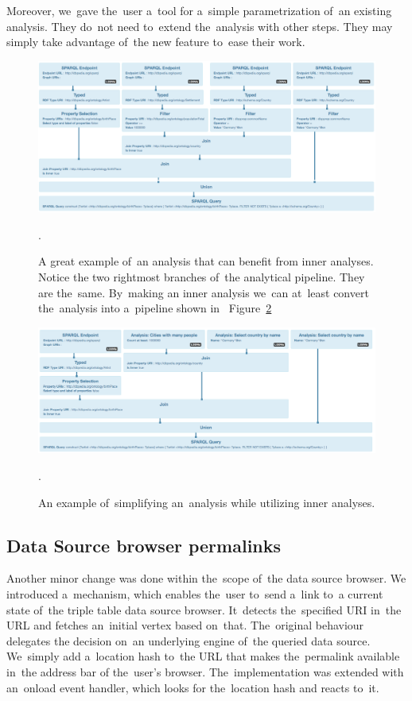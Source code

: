 Moreover, we~gave the~user a~tool for a~simple parametrization of~an existing analysis. 
They do~not need to~extend the~analysis with other steps. They may simply take 
advantage of~the new feature to~ease their work.

\begin{figure}
	\centering
	\includegraphics[width=140mm]{img/inner-example.png}
	\caption{A great example of~an analysis that can benefit from inner analyses. Notice the
	two rightmost branches of~the analytical pipeline. They are the~same. By~making
	an inner analysis we~can at~least convert the~analysis into a~pipeline shown in~	Figure~\ref{fig:inner-example-simpler}}.
	\label{fig:inner-example}
\end{figure}

\begin{figure}
	\centering
	\includegraphics[width=140mm]{img/inner-example-simpler.png}
	\caption{An example of~simplifying an~analysis while utilizing inner analyses.}.
	\label{fig:inner-example-simpler}
\end{figure}

\subsection{Data Source browser permalinks}
Another minor change was done within the~scope of~the data source browser.
We introduced a~mechanism, which enables the~user to~send a~link to~a current 
state of~the triple table data source browser. It~detects the~specified URI in~the URL and fetches an~initial vertex based on~that. The~original behaviour delegates 
the decision on~an underlying engine of~the queried data source. We~simply add a~location hash to~the URL that makes the~permalink available in~the address bar 
of the~user's browser. The~implementation was extended with an~onload event 
handler, which looks for the~location hash and reacts to~it.

